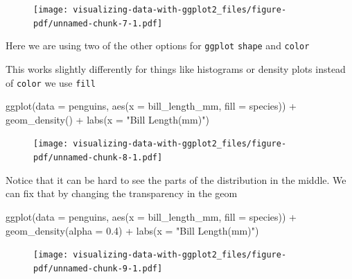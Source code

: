 \documentclass[
  letterpaper,
  DIV=11,
  numbers=noendperiod,
  oneside]{scrreprt}
\newenvironment{Shaded}{\begin{snugshade}}{\end{snugshade}}
\newcommand{\AttributeTok}[1]{\textcolor[rgb]{0.40,0.45,0.13}{#1}}
\newcommand{\FloatTok}[1]{\textcolor[rgb]{0.68,0.00,0.00}{#1}}
\newcommand{\FunctionTok}[1]{\textcolor[rgb]{0.28,0.35,0.67}{#1}}
\newcommand{\NormalTok}[1]{\textcolor[rgb]{0.00,0.23,0.31}{#1}}
\newcommand{\SpecialCharTok}[1]{\textcolor[rgb]{0.37,0.37,0.37}{#1}}
\newcommand{\StringTok}[1]{\textcolor[rgb]{0.13,0.47,0.30}{#1}}
\begin{document}
\begin{figure}[H]

{\centering \texttt{[image: visualizing-data-with-ggplot2\_files/figure-pdf/unnamed-chunk-7-1.pdf]}

}

\end{figure}

Here we are using two of the other options for \texttt{ggplot}
\texttt{shape} and \texttt{color}

This works slightly differently for things like histograms or density
plots instead of \texttt{color} we use \texttt{fill}

\begin{Shaded}
\begin{Highlighting}[]
\FunctionTok{ggplot}\NormalTok{(}\AttributeTok{data =}\NormalTok{ penguins, }\FunctionTok{aes}\NormalTok{(}\AttributeTok{x =}\NormalTok{ bill\_length\_mm, }\AttributeTok{fill =}\NormalTok{ species)) }\SpecialCharTok{+}
\FunctionTok{geom\_density}\NormalTok{() }\SpecialCharTok{+}
\FunctionTok{labs}\NormalTok{(}\AttributeTok{x =} \StringTok{"Bill Length(mm)"}\NormalTok{)}
\end{Highlighting}
\end{Shaded}

\begin{figure}[H]

{\centering \texttt{[image: visualizing-data-with-ggplot2\_files/figure-pdf/unnamed-chunk-8-1.pdf]}

}

\end{figure}

Notice that it can be hard to see the parts of the distribution in the
middle. We can fix that by changing the transparency in the geom

\begin{Shaded}
\begin{Highlighting}[]
\FunctionTok{ggplot}\NormalTok{(}\AttributeTok{data =}\NormalTok{ penguins, }\FunctionTok{aes}\NormalTok{(}\AttributeTok{x =}\NormalTok{ bill\_length\_mm, }\AttributeTok{fill =}\NormalTok{ species)) }\SpecialCharTok{+}
\FunctionTok{geom\_density}\NormalTok{(}\AttributeTok{alpha =} \FloatTok{0.4}\NormalTok{) }\SpecialCharTok{+}
\FunctionTok{labs}\NormalTok{(}\AttributeTok{x =} \StringTok{"Bill Length(mm)"}\NormalTok{)}
\end{Highlighting}
\end{Shaded}

\begin{figure}[H]

{\centering \texttt{[image: visualizing-data-with-ggplot2\_files/figure-pdf/unnamed-chunk-9-1.pdf]}

}

\end{figure}
\end{document}
